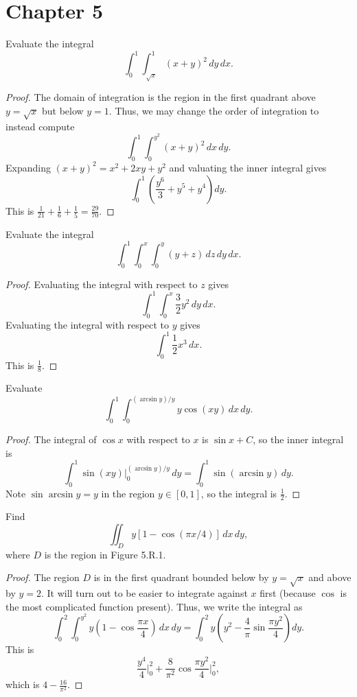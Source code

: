 \documentclass[openany]{book}
\begin{document}
\section{Chapter 5}
\begin{prob}[3]
    Evaluate the integral
    \[
    \int_{0}^{1} \int_{\sqrt{x}}^{1} (x+y)^{2} \, dy \, dx.
    \]
\end{prob}
\begin{proof}
    The domain of integration is the region in the first quadrant above $y=\sqrt x$ but below $y=1$. Thus, we may change the order of integration to instead compute
    \[\int_0^1\int_{0}^{y^2}(x+y)^2\,dx\,dy.\]
    Expanding $(x+y)^2=x^2+2xy+y^2$ and valuating the inner integral gives
    \[\int_{0}^{1}\left(\frac{y^{6}}{3}+y^{5}+y^{4}\right)dy.\]
    This is $\frac1{21}+\frac16+\frac15=\frac{29}{70}$.
\end{proof}

\begin{prob}[9]
    Evaluate the integral
    \[
    \int_{0}^{1} \int_{0}^{x} \int_{0}^{y} (y+z) \, dz \, dy \, dx.
    \]
\end{prob}
\begin{proof}
    Evaluating the integral with respect to $z$ gives
    \[\int_0^1\int_0^x\frac32y^2\,dy\,dx.\]
    Evaluating the integral with respect to $y$ gives
    \[\int_0^1\frac12x^3\,dx.\]
    This is $\frac18$.
\end{proof}

\begin{prob}[11]
    Evaluate
    \[
    \int_{0}^{1} \int_{0}^{(\arcsin y)/y} y \cos(xy) \, dx \, dy.
    \]
\end{prob}
\begin{proof}
    The integral of $\cos x$ with respect to $x$ is $\sin x+C$, so the inner integral is
    \[\int_{0}^{1} \sin(xy)\bigg|_{0}^{(\arcsin y)/y} \, dy=\int_0^1\sin(\arcsin y)\,dy.\]
    Note $\sin\arcsin y=y$ in the region $y\in[0,1]$, so the integral is $\frac12$.
\end{proof}

\begin{prob}[16]
    Find
    \[
    \iint_{D} y[1-\cos(\pi x/4)] \, dx \, dy,
    \]
    where \( D \) is the region in Figure 5.R.1.
\end{prob}
\begin{proof}
    The region $D$ is in the first quadrant bounded below by $y=\sqrt x$ and above by $y=2$. It will turn out to be easier to integrate against $x$ first (because $\cos$ is the most complicated function present). Thus, we write the integral as
    \[\int_0^2\int_0^{y^2}y\left(1-\cos\frac{\pi x}4\right)\,dx\,dy=\int_{0}^{2}y\left(y^{2}-\frac{4}{\pi}\sin\frac{\pi y^{2}}{4}\right)dy.\]
    This is
    \[\frac{y^4}4\bigg|_0^2+\frac{8}{\pi^2}\cos\frac{\pi y^2}4\bigg|_0^2,\]
    which is $4-\frac{16}{\pi^2}$.
\end{proof}
\end{document}
